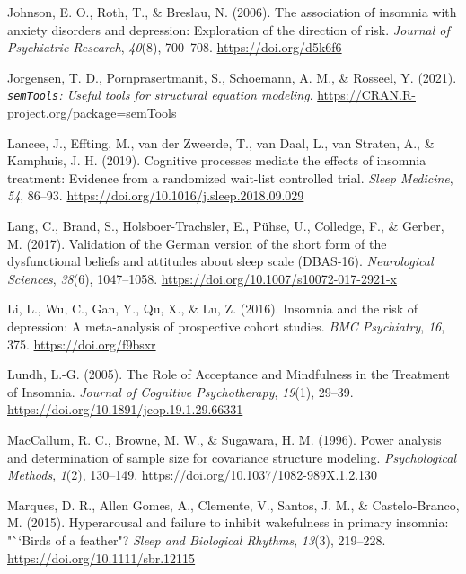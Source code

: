 \documentclass[
  ,doc,11pt, twoside,floatsintext]{apa6}
\newlength{\cslhangindent}
\newlength{\cslentryspacingunit} %
\newenvironment{CSLReferences}[2] %
 {%
  \setlength{\parindent}{0pt}
  \ifodd #1
  \let\oldpar\par
  \def\par{\hangindent=\cslhangindent\oldpar}
  \fi
  \setlength{\parskip}{#2\cslentryspacingunit}
 }%
 {}
\begin{document}
\begin{CSLReferences}{1}{0}
\leavevmode{}%
Johnson, E. O., Roth, T., \& Breslau, N. (2006). The association of insomnia with anxiety disorders and depression: Exploration of the direction of risk. \emph{Journal of Psychiatric Research}, \emph{40}(8), 700--708. \url{https://doi.org/d5k6f6}

\leavevmode{}%
Jorgensen, T. D., Pornprasertmanit, S., Schoemann, A. M., \& Rosseel, Y. (2021). \emph{\texttt{semTools}: {U}seful tools for structural equation modeling}. \url{https://CRAN.R-project.org/package=semTools}

\leavevmode{}%
Lancee, J., Effting, M., van der Zweerde, T., van Daal, L., van Straten, A., \& Kamphuis, J. H. (2019). Cognitive processes mediate the effects of insomnia treatment: Evidence from a randomized wait-list controlled trial. \emph{Sleep Medicine}, \emph{54}, 86--93. \url{https://doi.org/10.1016/j.sleep.2018.09.029}

\leavevmode{}%
Lang, C., Brand, S., Holsboer-Trachsler, E., Pühse, U., Colledge, F., \& Gerber, M. (2017). Validation of the {German} version of the short form of the dysfunctional beliefs and attitudes about sleep scale ({DBAS-16}). \emph{Neurological Sciences}, \emph{38}(6), 1047--1058. \url{https://doi.org/10.1007/s10072-017-2921-x}

\leavevmode{}%
Li, L., Wu, C., Gan, Y., Qu, X., \& Lu, Z. (2016). Insomnia and the risk of depression: A meta-analysis of prospective cohort studies. \emph{BMC Psychiatry}, \emph{16}, 375. \url{https://doi.org/f9bsxr}

\leavevmode{}%
Lundh, L.-G. (2005). The {Role} of {Acceptance} and {Mindfulness} in the {Treatment} of {Insomnia}. \emph{Journal of Cognitive Psychotherapy}, \emph{19}(1), 29--39. \url{https://doi.org/10.1891/jcop.19.1.29.66331}

\leavevmode{}%
MacCallum, R. C., Browne, M. W., \& Sugawara, H. M. (1996). Power analysis and determination of sample size for covariance structure modeling. \emph{Psychological Methods}, \emph{1}(2), 130--149. \url{https://doi.org/10.1037/1082-989X.1.2.130}

\leavevmode{}%
Marques, D. R., Allen Gomes, A., Clemente, V., Santos, J. M., \& Castelo-Branco, M. (2015). Hyperarousal and failure to inhibit wakefulness in primary insomnia: "``Birds of a feather"? \emph{Sleep and Biological Rhythms}, \emph{13}(3), 219--228. \url{https://doi.org/10.1111/sbr.12115}


\end{CSLReferences}
\end{document}
